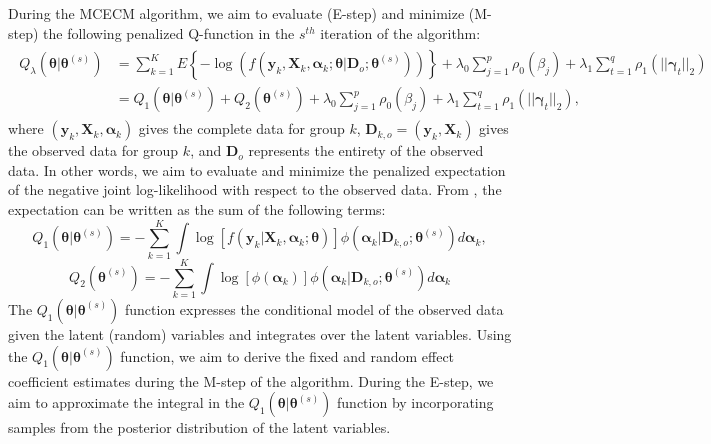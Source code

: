 During the MCECM algorithm, we  aim  to  evaluate  (E-step)  and  minimize  (M-step)  the following penalized Q-function in the \(s^{th}\) iteration of the algorithm: \begin{align}
  \begin{aligned}
    Q_\lambda(\boldsymbol\theta | \boldsymbol \theta^{(s)}) & = \sum_{k=1}^K E \left \{ -\log(f(\boldsymbol y_k, \boldsymbol X_k, \boldsymbol\alpha_k;\boldsymbol\theta | \boldsymbol D_o; \boldsymbol\theta^{(s)})) \right \} + \lambda_0 \sum_{j=1}^{p} \rho_0 \left (\beta_j \right ) + \lambda_1 \sum_{t=1}^{q} \rho_1 \left (||\boldsymbol\gamma_t||_2 \right ) \\
    & = Q_1(\boldsymbol\theta | \boldsymbol\theta^{(s)}) + Q_2(\boldsymbol\theta^{(s)}) + \lambda_0 \sum_{j=1}^{p} \rho_0 \left (\beta_j \right ) + \lambda_1 \sum_{t=1}^{q} \rho_1 \left (||\boldsymbol\gamma_t||_2 \right ),
    \label{eqn:Qfun}
  \end{aligned}
\end{align} where
\((\boldsymbol y_k, \boldsymbol X_k, \boldsymbol \alpha_k)\) gives the
complete data for group $k$,  \(\boldsymbol D_{k,o} = (\boldsymbol y_k, \boldsymbol X_k)\) gives the observed data
for group $k$, and \(\boldsymbol D_o\) represents the entirety of the observed
data. In other words, we aim to evaluate and minimize the penalized expectation of the negative joint log-likelihood with respect to the observed data. From \cite{rashid2020}, the expectation can be written as the sum of the following terms:
\begin{equation}
  Q_1(\boldsymbol\theta | \boldsymbol\theta^{(s)}) = - \sum_{k=1}^K \int \log [f(\boldsymbol y_k | \boldsymbol X_k, \boldsymbol\alpha_k; \boldsymbol\theta)] \phi(\boldsymbol\alpha_k | \boldsymbol D_{k,o}; \boldsymbol\theta^{(s)}) d \boldsymbol\alpha_k,
  \label{eqn:Q1}
\end{equation} \begin{equation}
   Q_2(\boldsymbol\theta^{(s)}) = - \sum_{k=1}^K \int \log [\phi(\boldsymbol{\alpha}_k)] \phi(\boldsymbol\alpha_k | \boldsymbol D_{k,o}; \boldsymbol\theta^{(s)}) d \boldsymbol\alpha_k
  \label{eqn:Q2}
\end{equation}
The $Q_1(\boldsymbol\theta | \boldsymbol\theta^{(s)})$ function expresses the conditional model of the observed data given the latent (random) variables and integrates over the latent variables. Using the $Q_1(\boldsymbol\theta | \boldsymbol\theta^{(s)})$ function, we aim to derive the fixed and random effect coefficient estimates during the M-step of the algorithm. During the E-step, we aim to approximate the integral in the $Q_1(\boldsymbol\theta | \boldsymbol\theta^{(s)})$ function by incorporating samples from the posterior distribution of the latent variables.

